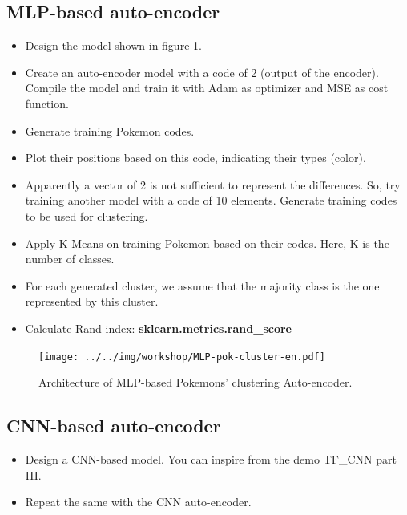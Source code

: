 \documentclass[11pt, a4paper]{article}
\begin{document}
\subsection{MLP-based auto-encoder}

\begin{itemize}
	\item Design the model shown in figure \ref{fig:MLP-pok-cluster-en}.
	\item Create an auto-encoder model with a code of 2 (output of the encoder). 
	Compile the model and train it with Adam as optimizer and MSE as cost function.
	\item Generate training Pokemon codes.
	\item Plot their positions based on this code, indicating their types (color).
	\item Apparently a vector of 2 is not sufficient to represent the differences. 
	So, try training another model with a code of 10 elements. Generate training codes to be used for clustering.
	\item Apply K-Means on training Pokemon based on their codes. 
	Here, K is the number of classes.
	\item For each generated cluster, we assume that the majority class is the one represented by this cluster.
	\item Calculate Rand index: \textbf{sklearn.metrics.rand\_score}
\end{itemize}

\begin{figure}[htp]
	\centering
	\texttt{[image: ../../img/workshop/MLP-pok-cluster-en.pdf]}
	\caption{Architecture of MLP-based Pokemons' clustering Auto-encoder.}
	\label{fig:MLP-pok-cluster-en}
\end{figure}

\subsection{CNN-based auto-encoder}

\begin{itemize}
	\item Design a CNN-based model. 
	You can inspire from the demo TF\_CNN part III.
	\item Repeat the same with the CNN auto-encoder.
\end{itemize}
\end{document}
